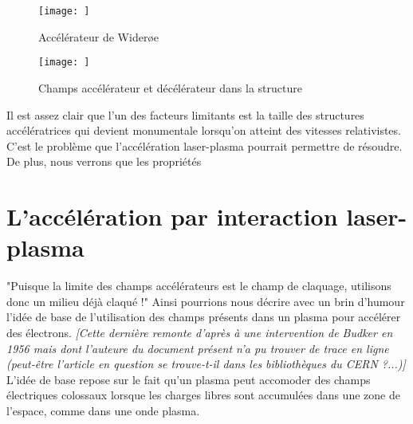 \documentclass[a4paper]{book}
\begin{document}
\begin{figure}[!htbp]
\begin{center}
\texttt{[image: ]}
\end{center}
\caption{Accélérateur de Wider{\o}e }
\label{fig:wideroe}
\end{figure}

\begin{figure}[!htbp]
\begin{center}
\texttt{[image: ]}
\end{center}
\caption{Champs accélérateur et décélérateur dans la structure}
\label{fig:acc_dec}
\end{figure}

Il est assez clair que l'un des facteurs limitants est la taille des structures accélératrices qui devient monumentale lorsqu'on atteint des vitesses relativistes. C'est le problème que l'accélération laser-plasma pourrait permettre de résoudre. De plus, nous verrons que les propriétés 


\section{L'accélération par interaction laser-plasma}

"Puisque la limite des champs accélérateurs est le champ de claquage, utilisons donc un milieu déjà claqué !" Ainsi pourrions nous décrire avec un brin d'humour l'idée de base de l'utilisation des champs présents dans un plasma pour accélérer des électrons. \textit{[Cette dernière remonte d'après \cite{malka} à une intervention de Budker en 1956 \cite{budker} mais dont l'auteure du document présent n'a pu trouver de trace en ligne (peut-être l'article en question se trouve-t-il dans les bibliothèques du CERN ?...)]}  
L'idée de base repose sur le fait qu'un plasma peut accomoder des champs électriques colossaux lorsque les charges libres sont accumulées dans une zone de l'espace, comme dans une onde plasma. 


\medskip
\end{document}
